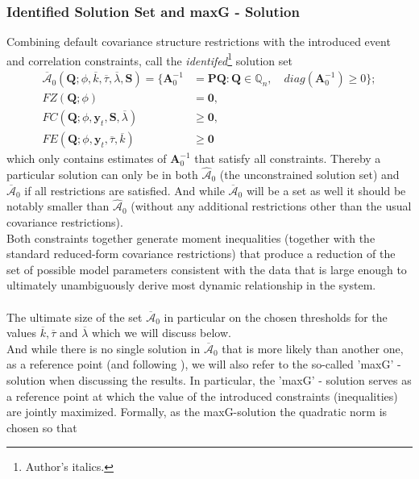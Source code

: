 \documentclass[a4paper,11pt,listof=nochaptergap,oneside,pointednumbers,bibtotoc,bigheadings,liststotoc]{scrbook}
\theoremstyle{mysatz}
\theoremstyle{mydefinition}
\theoremstyle{mybemerkung}
\renewcommand*{\paragraph}[1]{\subsubsection*{#1} \vspace{-3mm}} %
\let\oldhat\hat
\newcommand{\vect}[1]{\boldsymbol{\mathbf{#1}}}
\newcommand{\hatt}[1]{\oldhat{\boldsymbol{\mathbf{#1}}}}
\begin{document}
\begin{itemize}
\paragraph{Identified Solution Set and maxG - Solution}
Combining default covariance structure restrictions with the introduced event and correlation constraints, \citet{ludvigsonetal:18} call the \textit{identifed}\footnote{Author's italics.} solution set 
\begin{equation} \label{eq:svar_ludvi14}
\begin{split}
\overline{\vect{\mathcal{A}}}_0(\vect{Q}; \phi, \overline{k}, \overline{\tau}, \overline{\lambda}, \vect{S})  = \{\vect{A}_0^{-1} & = \vect{P}\vect{Q}: \vect{Q} \in \mathbb{Q}_n, \quad diag(\vect{A}_0^{-1}) \geq 0\}; \\
			FZ(\vect{Q}; \phi) & = \vect{0}, \\
			FC(\vect{Q}; \phi, \vect{y}_t, \vect{S}, \overline{\lambda}) & \geq \vect{0}, \\
			FE(\vect{Q}; \phi, \vect{y}_t, \overline{\tau}, \overline{k}) & \geq \vect{0}
\end{split}								
\end{equation}
which only contains estimates of $\vect{A}_0^{-1}$ that satisfy all constraints. Thereby a particular solution can only be in both $\hatt{\mathcal{A}}_0$ (the unconstrained solution set) and $\overline{\vect{\mathcal{A}}}_0$ if all restrictions are satisfied. And while $\overline{\vect{\mathcal{A}}}_0$ will be a set as well it should be notably smaller than $\hatt{\mathcal{A}}_0$ (without any additional restrictions other than the usual covariance restrictions).
\\
Both constraints together generate moment inequalities (together with the standard reduced-form covariance restrictions) that produce a reduction of the set of possible model parameters consistent with the data that is large enough to ultimately unambiguously derive most dynamic relationship in the system.\\
\\
The ultimate size of the set $\overline{\vect{\mathcal{A}}}_0$ in particular on the chosen thresholds for the values $\overline{k}, \overline{\tau}$ and $\overline{\lambda}$ which we will discuss below.\\
And while there is no single solution in $\overline{\vect{\mathcal{A}}}_0$ that is more likely than another one, as a reference point (and following \citet{ludvigsonetal:18}), we will also refer to the so-called 'maxG' - solution when discussing the results. In particular, the 'maxG' - solution serves as a reference point at which the value of the introduced constraints (inequalities) are jointly maximized. Formally, as the maxG-solution the quadratic norm is chosen so that

\end{itemize}
\end{document}
